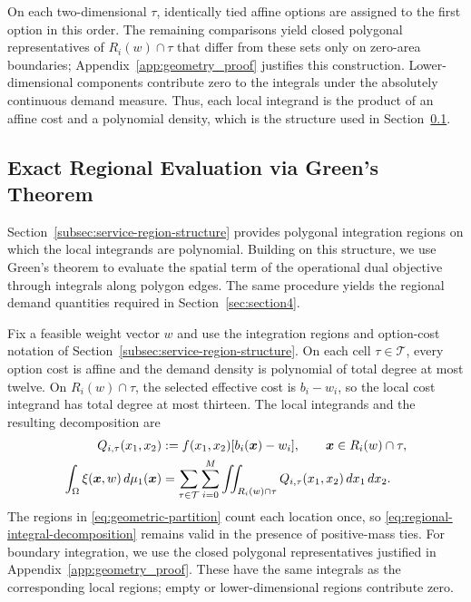 \documentclass[a4paper,fleqn]{cas-sc}
\theoremstyle{remark}
\theoremstyle{plain}
\begin{document}
On each two-dimensional $\tau$, identically tied affine options are assigned to the first option in this order. The remaining comparisons yield closed polygonal representatives of $R_i(w)\cap\tau$ that differ from these sets only on zero-area boundaries; Appendix~\ref{app:geometry_proof} justifies this construction. Lower-dimensional components contribute zero to the integrals under the absolutely continuous demand measure. Thus, each local integrand is the product of an affine cost and a polynomial density, which is the structure used in Section~\ref{subsec:gradient-structure}.

\subsection{Exact Regional Evaluation via Green's Theorem}\label{subsec:gradient-structure}

Section~\ref{subsec:service-region-structure} provides polygonal integration regions on which the local integrands are polynomial. Building on this structure, we use Green's theorem to evaluate the spatial term of the operational dual objective through integrals along polygon edges. The same procedure yields the regional demand quantities required in Section~\ref{sec:section4}.

Fix a feasible weight vector $w$ and use the integration regions and option-cost notation of Section~\ref{subsec:service-region-structure}. On each cell $\tau\in\mathcal T$, every option cost is affine and the demand density is polynomial of total degree at most twelve. On $R_i(w)\cap\tau$, the selected effective cost is $b_i-w_i$, so the local cost integrand has total degree at most thirteen. The local integrands and the resulting decomposition are
\begin{subequations}\label{eq:regional-cost-integrals}
\allowdisplaybreaks[0]
\begin{align}
    Q_{i,\tau}(x_1,x_2)&:=f(x_1,x_2)[b_i(\bm x)-w_i],\qquad \bm x\in R_i(w)\cap\tau,\label{eq:local-cost-integrand}\\
    \int_\Omega\xi(\bm x,w)\,d\mu_1(\bm x)&=\sum_{\tau\in\mathcal T}\sum_{i=0}^M\iint_{R_i(w)\cap\tau}Q_{i,\tau}(x_1,x_2)\,dx_1\,dx_2.\label{eq:regional-integral-decomposition}
\end{align}
\end{subequations}
The regions in \eqref{eq:geometric-partition} count each location once, so \eqref{eq:regional-integral-decomposition} remains valid in the presence of positive-mass ties. For boundary integration, we use the closed polygonal representatives justified in Appendix~\ref{app:geometry_proof}. These have the same integrals as the corresponding local regions; empty or lower-dimensional regions contribute zero.
\end{document}
